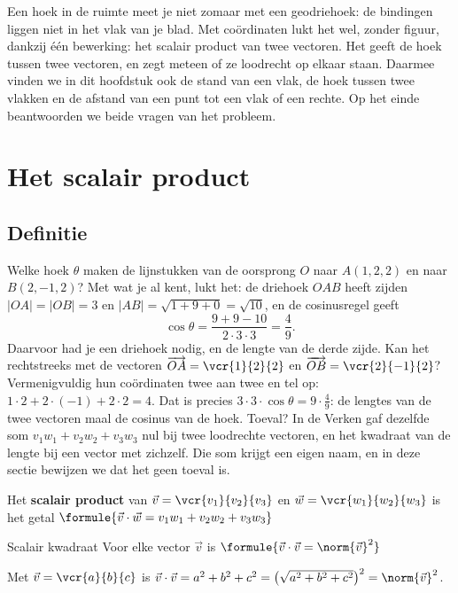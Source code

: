 Een hoek in de ruimte meet je niet zomaar met een geodriehoek: de bindingen liggen niet in het vlak van je blad. Met coördinaten lukt het wel, zonder figuur, dankzij één bewerking: het scalair product van twee vectoren. Het geeft de hoek tussen twee vectoren, en zegt meteen of ze loodrecht op elkaar staan. Daarmee vinden we in dit hoofdstuk ook de stand van een vlak, de hoek tussen twee vlakken en de afstand van een punt tot een vlak of een rechte. Op het einde beantwoorden we beide vragen van het probleem.

\begin{oefeningen}[Start]

\end{oefeningen}

\section{Het scalair product}

\subsection{Definitie}

Welke hoek $\theta$ maken de lijnstukken van de oorsprong $O$ naar $A(1, 2, 2)$ en naar $B(2, -1, 2)$? Met wat je al kent, lukt het: de driehoek $OAB$ heeft zijden $|OA| = |OB| = 3$ en $|AB| = \sqrt{1 + 9 + 0} = \sqrt{10}$, en de cosinusregel geeft
\[\cos\theta = \frac{9 + 9 - 10}{2 \cdot 3 \cdot 3} = \frac49 .\]
Daarvoor had je een driehoek nodig, en de lengte van de derde zijde. Kan het rechtstreeks met de vectoren $\overrightarrow{OA} = \vcr{1}{2}{2}$ en $\overrightarrow{OB} = \vcr{2}{-1}{2}$? Vermenigvuldig hun coördinaten twee aan twee en tel op: $1 \cdot 2 + 2 \cdot (-1) + 2 \cdot 2 = 4$. Dat is precies $3 \cdot 3 \cdot \cos\theta = 9 \cdot \frac49$: de lengtes van de twee vectoren maal de cosinus van de hoek. Toeval? In de Verken gaf dezelfde som $v_1w_1 + v_2w_2 + v_3w_3$ nul bij twee loodrechte vectoren, en het kwadraat van de lengte bij een vector met zichzelf. Die som krijgt een eigen naam, en in deze sectie bewijzen we dat het geen toeval is.

\begin{theorie}
Het \textbf{\textcolor{accent}{scalair product}} van $\vec v = \vcr{v_1}{v_2}{v_3}$ en $\vec w = \vcr{w_1}{w_2}{w_3}$ is het getal \quad $\formule{\vec v \cdot \vec w = v_1w_1 + v_2w_2 + v_3w_3}$
\begin{stelling}{Scalair kwadraat}
Voor elke vector $\vec v$ is \quad $\formule{\vec v \cdot \vec v = \norm{\vec v}^2}$
\end{stelling}
\begin{bewijs}
Met $\vec v = \vcr{a}{b}{c}$ is $\vec v \cdot \vec v = a^2 + b^2 + c^2 = \bigl(\sqrt{a^2 + b^2 + c^2}\bigr)^2 = \norm{\vec v}^2$.
\end{bewijs}
\end{theorie}

